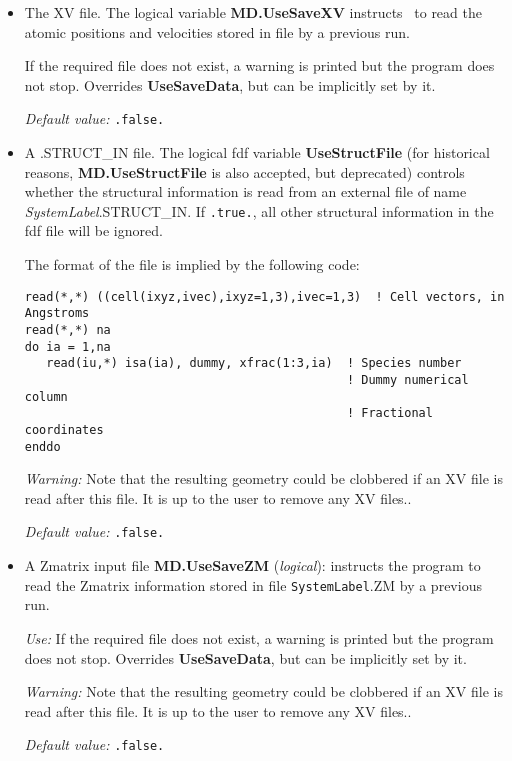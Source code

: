 \begin{itemize}

\item The XV file.
 
The logical variable \textbf{MD.UseSaveXV} instructs \siesta\ to
read the atomic positions and velocities stored in file  by a previous run.

If the required file does not exist, a warning is printed but the
program does not stop. Overrides \textbf{UseSaveData}, but can be
implicitly set by it.

\textit{Default value:} \texttt{.false.}

\item A .STRUCT\_IN file. The logical fdf variable \textbf{UseStructFile}
  (for historical reasons, \textbf{MD.UseStructFile} is also accepted,
  but deprecated)
  controls whether the structural information is read from an external
  file of name \textit{SystemLabel}.STRUCT\_IN.  If \texttt{.true.}, all
  other structural information in the fdf file will be
  ignored.

The format of the file is implied by the following code:

\begin{verbatim}
read(*,*) ((cell(ixyz,ivec),ixyz=1,3),ivec=1,3)  ! Cell vectors, in Angstroms
read(*,*) na
do ia = 1,na
   read(iu,*) isa(ia), dummy, xfrac(1:3,ia)  ! Species number
                                             ! Dummy numerical column
                                             ! Fractional coordinates
enddo
\end{verbatim}

\textit{Warning:} Note that the resulting geometry could be clobbered if
an XV file is read after this file. It is up to the user to remove
any XV files..

\textit{Default value:} \texttt{.false.}


\item A Zmatrix input file
\textbf{MD.UseSaveZM} (\textit{logical}):
instructs the program to read the Zmatrix information stored
in file \texttt{SystemLabel}.ZM by a previous run.

\textit{Use:} If the required file does not exist, a warning is
printed but the program does not stop. Overrides \textbf{UseSaveData},
but can be implicitly set by it.

\textit{Warning:} Note that the resulting geometry could be clobbered if
an XV file is read after this file. It is up to the user to remove
any XV files..

\textit{Default value:} \texttt{.false.}
\end{itemize}

